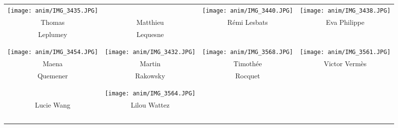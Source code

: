 \vfill
\vspace{2mm}
\begin{center}
\begin{tabular}{cccc}
\texttt{[image: anim/IMG\_3435.JPG]} &
&
\texttt{[image: anim/IMG\_3440.JPG]} &
\texttt{[image: anim/IMG\_3438.JPG]} \\

Thomas & Matthieu & Rémi Lesbats & Eva Philippe \\ Leplumey & Lequesne & & \\ \\ \\

\texttt{[image: anim/IMG\_3454.JPG]} &
\texttt{[image: anim/IMG\_3432.JPG]} &
\texttt{[image: anim/IMG\_3568.JPG]} &
\texttt{[image: anim/IMG\_3561.JPG]} \\

Maena & Martin & Timothée & Victor Vermès \\ Quemener & Rakowsky & Rocquet &  \\ \\ \\

&
\texttt{[image: anim/IMG\_3564.JPG]}  \\

Lucie Wang & Lilou Wattez \\\



\end{tabular}
\end{center}